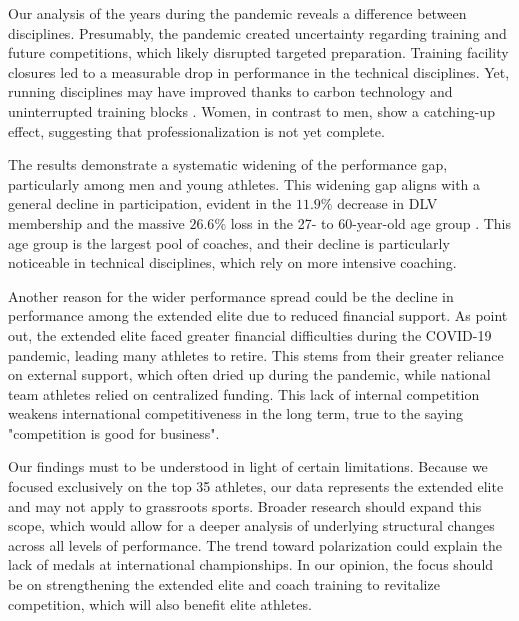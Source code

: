 Our analysis of the years during the pandemic reveals a difference between disciplines. Presumably, the pandemic created uncertainty regarding training and future competitions, which likely disrupted targeted preparation. Training facility closures led to a measurable drop in performance in the technical disciplines. Yet, running disciplines may have improved thanks to carbon technology \citep{willwacherDoesAdvancedFootwear2023} and uninterrupted training blocks \citep{venkatesanRunningPerformanceCOVID192022}. Women, in contrast to men, show a catching-up effect, suggesting that professionalization is not yet complete.

The results demonstrate a systematic widening of the performance gap, particularly among men and young athletes. This widening gap aligns with a general decline in participation, evident in the $11.9\%$ decrease in DLV membership and the massive $26.6\%$ loss in the 27- to 60-year-old age group \citep{LeichtathletikPortalDownloads}. This age group is the largest pool of coaches, and their decline is particularly noticeable in technical disciplines, which rely on more intensive coaching.

Another reason for the wider performance spread could be the decline in performance among the extended elite due to reduced financial support. As \citet{breuerOekonomischenAuswirkungenCOVID19} point out, the extended elite faced greater financial difficulties during the COVID-19 pandemic, leading many athletes to retire. This stems from their greater reliance on external support, which often dried up during the pandemic, while national team athletes relied on centralized funding. This lack of internal competition weakens international competitiveness in the long term, true to the saying "competition is good for business".

Our findings must to be understood in light of certain limitations. Because we focused exclusively on the top 35 athletes, our data represents the extended elite and may not apply to grassroots sports. Broader research should expand this scope, which would allow for a deeper analysis of underlying structural changes across all levels of performance. The trend toward polarization could explain the lack of medals at international championships. In our opinion, the focus should be on strengthening the extended elite and coach training to revitalize competition, which will also benefit elite athletes.
